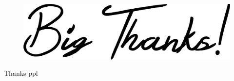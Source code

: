 
\vspace*{\fill}
\begin{figure}[H]
    \center
    \includegraphics[width=0.8\linewidth]{ch.appendix/imgs/bigthanks.png}
\end{figure}
\vspace*{\fill}

\newpage

Thanks ppl
